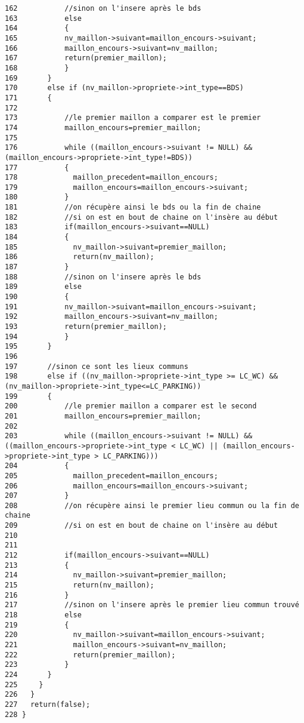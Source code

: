 \begin{Code}
\begin{verbatim}
162           //sinon on l'insere après le bds
163           else
164           {
165           nv_maillon->suivant=maillon_encours->suivant;
166           maillon_encours->suivant=nv_maillon;
167           return(premier_maillon);
168           }
169       }
170       else if (nv_maillon->propriete->int_type==BDS)
171       {   
172       
173           //le premier maillon a comparer est le premier
174           maillon_encours=premier_maillon;
175         
176           while ((maillon_encours->suivant != NULL) &&  (maillon_encours->propriete->int_type!=BDS))
177           {
178             maillon_precedent=maillon_encours;
179             maillon_encours=maillon_encours->suivant;
180           }
181           //on récupère ainsi le bds ou la fin de chaine
182           //si on est en bout de chaine on l'insère au début
183           if(maillon_encours->suivant==NULL)
184           {
185             nv_maillon->suivant=premier_maillon;
186             return(nv_maillon);
187           }
188           //sinon on l'insere après le bds
189           else
190           {
191           nv_maillon->suivant=maillon_encours->suivant;
192           maillon_encours->suivant=nv_maillon;
193           return(premier_maillon);
194           }
195       }
196             
197       //sinon ce sont les lieux communs
198       else if ((nv_maillon->propriete->int_type >= LC_WC) && (nv_maillon->propriete->int_type<=LC_PARKING))
199       {       
200           //le premier maillon a comparer est le second
201           maillon_encours=premier_maillon;
202 
203           while ((maillon_encours->suivant != NULL) &&  ((maillon_encours->propriete->int_type < LC_WC) || (maillon_encours->propriete->int_type > LC_PARKING)))
204           {
205             maillon_precedent=maillon_encours;
206             maillon_encours=maillon_encours->suivant;
207           }
208           //on récupère ainsi le premier lieu commun ou la fin de chaine
209           //si on est en bout de chaine on l'insère au début
210           
211 
212           if(maillon_encours->suivant==NULL)
213           {
214             nv_maillon->suivant=premier_maillon;
215             return(nv_maillon);
216           }
217           //sinon on l'insere après le premier lieu commun trouvé
218           else
219           {
220             nv_maillon->suivant=maillon_encours->suivant;
221             maillon_encours->suivant=nv_maillon;
222             return(premier_maillon);
223           }
224       }       
225     }
226   }
227   return(false);
228 }
\end{verbatim}\end{Code}


